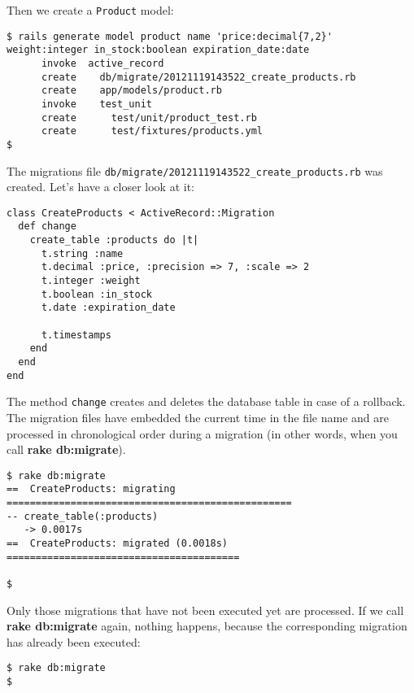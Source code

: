 \documentclass[a4paper]{book}
\newcounter{tab}[chapter]
\begin{document}
Then we create a \texttt{Product} model:

\begin{shaded}\begin{verbatim}
$ rails generate model product name 'price:decimal{7,2}' weight:integer in_stock:boolean expiration_date:date
      invoke  active_record
      create    db/migrate/20121119143522_create_products.rb
      create    app/models/product.rb
      invoke    test_unit
      create      test/unit/product_test.rb
      create      test/fixtures/products.yml
$
\end{verbatim}\end{shaded}

The migrations file \texttt{db/migrate/20121119143522\_create\_products.rb} was created. Let's have a closer look at it:

\begin{shaded}\begin{verbatim}
class CreateProducts < ActiveRecord::Migration
  def change
    create_table :products do |t|
      t.string :name
      t.decimal :price, :precision => 7, :scale => 2
      t.integer :weight
      t.boolean :in_stock
      t.date :expiration_date

      t.timestamps
    end
  end
end
\end{verbatim}\end{shaded}

The method \texttt{change} creates and deletes the database table in case of a rollback. The migration files have embedded the current time in the file name and are processed in chronological order during a migration (in other words, when you call \textbf{rake db:migrate}).

\begin{shaded}\begin{verbatim}
$ rake db:migrate
==  CreateProducts: migrating =================================================
-- create_table(:products)
   -> 0.0017s
==  CreateProducts: migrated (0.0018s) ========================================

$
\end{verbatim}\end{shaded}

Only those migrations that have not been executed yet are processed. If we call \textbf{rake db:migrate} again, nothing happens, because the corresponding migration has already been executed:

\begin{shaded}\begin{verbatim}
$ rake db:migrate
$
\end{verbatim}\end{shaded}
\end{document}
